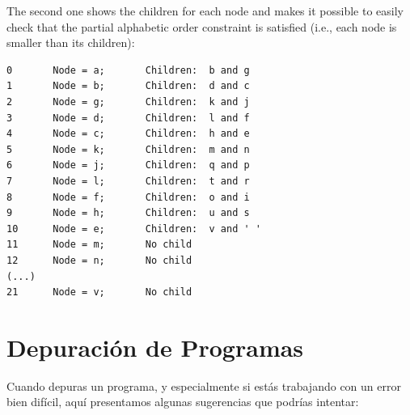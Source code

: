The second one shows the children for each node and makes it 
possible to easily check that the partial alphabetic order 
constraint is satisfied (i.e., each node is smaller than its 
children):

\begin{verbatim}
0       Node = a;       Children:  b and g
1       Node = b;       Children:  d and c
2       Node = g;       Children:  k and j
3       Node = d;       Children:  l and f
4       Node = c;       Children:  h and e
5       Node = k;       Children:  m and n
6       Node = j;       Children:  q and p
7       Node = l;       Children:  t and r
8       Node = f;       Children:  o and i
9       Node = h;       Children:  u and s
10      Node = e;       Children:  v and ' '
11      Node = m;       No child
12      Node = n;       No child
(...)
21      Node = v;       No child
\end{verbatim}



\section{Depuración de Programas}

Cuando depuras un programa, y especialmente si estás 
trabajando con un error bien difícil, aquí presentamos
algunas sugerencias que podrías intentar:

